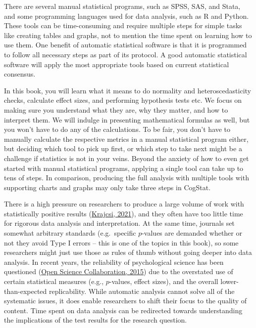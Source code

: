\documentclass[
  11pt,
]{book}
\theoremstyle{definition}
\theoremstyle{definition}
\theoremstyle{definition}
\theoremstyle{definition}
\theoremstyle{remark}
\begin{document}
There are several manual statistical programs, such as SPSS, SAS, and Stata, and some programming languages used for data analysis, such as R and Python. These tools can be time-consuming and require multiple steps for simple tasks like creating tables and graphs, not to mention the time spent on learning how to use them. One benefit of automatic statistical software is that it is programmed to follow all necessary steps as part of its protocol. A good automatic statistical software will apply the most appropriate tools based on current statistical consensus.

In this book, you will learn what it means to do normality and heteroscedasticity checks, calculate effect sizes, and performing hypothesis tests etc. We focus on making sure you understand what they are, why they matter, and how to interpret them. We will indulge in presenting mathematical formulas as well, but you won't have to do any of the calculations. To be fair, you don't have to manually calculate the respective metrics in a manual statistical program either, but deciding which tool to pick up first, or which step to take next might be a challenge if statistics is not in your veins. Beyond the anxiety of how to even get started with manual statistical programs, applying a single tool can take up to tens of steps. In comparison, producing the full analysis with multiple tools with supporting charts and graphs may only take three steps in CogStat.

There is a high pressure on researchers to produce a large volume of work with statistically positive results (\protect\hyperlink{ref-krajcsi_advancing_2021}{Krajcsi, 2021}), and they often have too little time for rigorous data analysis and interpretation. At the same time, journals set somewhat arbitrary standards (e.g.~specific \(p\)-values are demanded whether or not they avoid Type I errors -- this is one of the topics in this book), so some researchers might just use those as rules of thumb without going deeper into data analysis. In recent years, the reliability of psychological science has been questioned (\protect\hyperlink{ref-open_science_collaboration_estimating_2015}{Open Science Collaboration, 2015}) due to the overstated use of certain statistical measures (e.g., \(p\)-values, effect sizes), and the overall lower-than-expected replicability. While automatic analysis cannot solve all of the systematic issues, it does enable researchers to shift their focus to the quality of content. Time spent on data analysis can be redirected towards understanding the implications of the test results for the research question.
\end{document}
